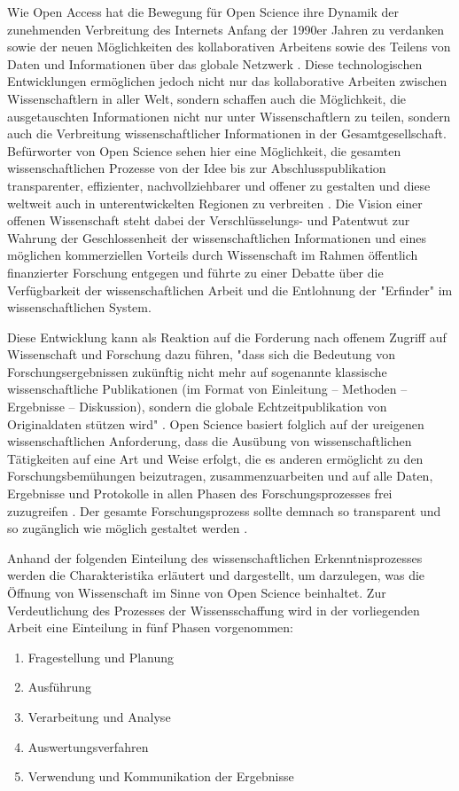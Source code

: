 Wie Open Access hat die Bewegung für Open Science ihre Dynamik der zunehmenden Verbreitung des Internets Anfang der 1990er Jahren zu verdanken \cite{Lievrouw_2010} sowie der neuen Möglichkeiten des kollaborativen Arbeitens sowie des Teilens von Daten und Informationen über das globale Netzwerk \cite{Meyer_2013}. Diese technologischen Entwicklungen ermöglichen jedoch nicht nur das kollaborative Arbeiten zwischen Wissenschaftlern in aller Welt, sondern schaffen auch die Möglichkeit, die ausgetauschten Informationen nicht nur unter Wissenschaftlern zu teilen, sondern auch die Verbreitung wissenschaftlicher Informationen in der Gesamtgesellschaft. Befürworter von Open Science sehen hier eine Möglichkeit, die gesamten wissenschaftlichen Prozesse von der Idee bis zur Abschlusspublikation transparenter, effizienter, nachvollziehbarer und offener zu gestalten \cite{Woelfle_2011} und diese weltweit auch in unterentwickelten Regionen zu verbreiten \cite{Yiotis_2005}. Die Vision einer offenen Wissenschaft steht dabei der Verschlüsselungs- und Patentwut zur Wahrung der Geschlossenheit der wissenschaftlichen Informationen und eines möglichen kommerziellen Vorteils durch Wissenschaft im Rahmen öffentlich finanzierter Forschung entgegen und führte zu einer Debatte über die Verfügbarkeit der wissenschaftlichen Arbeit und die Entlohnung der "Erfinder" im wissenschaftlichen System.

Diese Entwicklung kann als Reaktion auf die Forderung nach offenem Zugriff auf Wissenschaft und Forschung dazu führen, "dass sich die Bedeutung von Forschungsergebnissen zukünftig nicht mehr auf sogenannte klassische wissenschaftliche Publikationen (im Format von Einleitung – Methoden – Ergebnisse – Diskussion), sondern die globale Echtzeitpublikation von Originaldaten stützen wird" \cite{Stengel_2013}. Open Science basiert folglich auf der ureigenen wissenschaftlichen Anforderung, dass die Ausübung von wissenschaftlichen Tätigkeiten auf eine Art und Weise erfolgt, die es anderen ermöglicht zu den Forschungsbemühungen beizutragen, zusammenzuarbeiten und auf alle Daten, Ergebnisse und Protokolle in allen Phasen des Forschungsprozesses frei zuzugreifen \cite{RIN_2010}. Der gesamte Forschungsprozess sollte demnach so transparent und so zugänglich wie möglich gestaltet werden \cite{Scheliga_2014}.

Anhand der folgenden Einteilung des wissenschaftlichen Erkenntnisprozesses werden die Charakteristika erläutert und dargestellt, um darzulegen, was die Öffnung von Wissenschaft im Sinne von Open Science beinhaltet. Zur Verdeutlichung des Prozesses der Wissensschaffung wird in der vorliegenden Arbeit eine Einteilung in fünf Phasen vorgenommen:
\begin{enumerate}
\item Fragestellung und Planung
\item Ausführung
\item Verarbeitung und Analyse
\item Auswertungsverfahren
\item Verwendung und Kommunikation der Ergebnisse
\end{enumerate}

